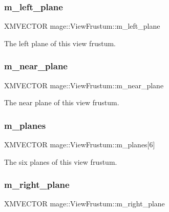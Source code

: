 \subsubsection{\texorpdfstring{m\+\_\+left\+\_\+plane}{m\_left\_plane}}
{\footnotesize\ttfamily X\+M\+V\+E\+C\+T\+OR mage\+::\+View\+Frustum\+::m\+\_\+left\+\_\+plane}

The left plane of this view frustum. \hypertarget{structmage_1_1_view_frustum_a3f8e1216b85b0f19839229c9cc9d97fb}{}\label{structmage_1_1_view_frustum_a3f8e1216b85b0f19839229c9cc9d97fb} 
\subsubsection{\texorpdfstring{m\+\_\+near\+\_\+plane}{m\_near\_plane}}
{\footnotesize\ttfamily X\+M\+V\+E\+C\+T\+OR mage\+::\+View\+Frustum\+::m\+\_\+near\+\_\+plane}

The near plane of this view frustum. \hypertarget{structmage_1_1_view_frustum_a671ec972dbd87a714cfd114a57d47949}{}\label{structmage_1_1_view_frustum_a671ec972dbd87a714cfd114a57d47949} 
\subsubsection{\texorpdfstring{m\+\_\+planes}{m\_planes}}
{\footnotesize\ttfamily X\+M\+V\+E\+C\+T\+OR mage\+::\+View\+Frustum\+::m\+\_\+planes\mbox{[}6\mbox{]}}

The six planes of this view frustum. \hypertarget{structmage_1_1_view_frustum_a95718f7a8fdd743872b93904e99b4268}{}\label{structmage_1_1_view_frustum_a95718f7a8fdd743872b93904e99b4268} 
\subsubsection{\texorpdfstring{m\+\_\+right\+\_\+plane}{m\_right\_plane}}
{\footnotesize\ttfamily X\+M\+V\+E\+C\+T\+OR mage\+::\+View\+Frustum\+::m\+\_\+right\+\_\+plane}

